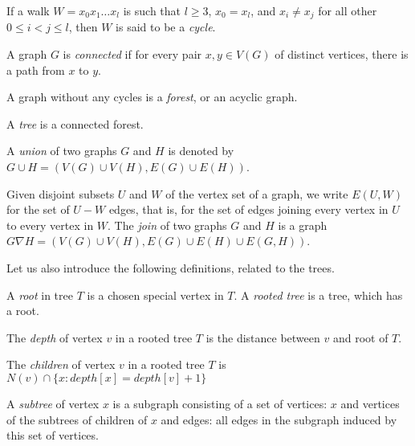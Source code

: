 \begin{definition}[cycle]
  If a walk $W = x_0 x_1 \ldots x_l$ is such that $l \geq 3$, $x_0 = x_l$, and $x_i \ne x_j$ for all other $0 \leq i < j \leq l$, then $W$ is said to be a \emph{cycle}.
\end{definition}

\begin{definition}
     A graph $G$ is \emph{connected} if for every pair $x, y \in V(G)$ of distinct vertices, there is a path from $x$ to $y$.
\end{definition}

\begin{definition}
    A graph without any cycles is a \emph{forest}, or an acyclic graph.
    
    A \emph{tree} is a connected forest.
\end{definition}

\begin{definition}[union]
    A \emph{union} of two graphs $G$ and $H$ is denoted by $G \cup H = (V(G) \cup V(H), E(G) \cup E(H))$.
\end{definition}

\begin{definition}[join]
Given disjoint subsets $U$ and $W$ of the vertex set of a graph, we write $E(U,W)$ for the set of $U - W$ edges, that is, for the set of edges joining every vertex in $U$ to every vertex in $W$. The \emph{join} of two graphs $G$ and $H$ is a graph $G \nabla H = (V(G) \cup V(H), E(G) \cup E(H) \cup E(G, H) )$.
\end{definition}

Let us also introduce the following definitions, related to the trees.

\begin{definition}
    A \emph{root} in tree $T$ is a chosen special vertex in $T$.
    A \emph{rooted tree} is a tree, which has a root.
\end{definition}

The \emph{depth} of vertex $v$ in a rooted tree $T$ is the distance between $v$ and root of $T$. 

\begin{definition}[children]
    The \emph{children} of vertex $v$ in a rooted tree $T$ is $N(v) \cap \{x : depth[x] = depth[v] + 1\}$
\end{definition}

\begin{definition}[subtree]
    A \emph{subtree} of vertex $x$ is a subgraph consisting of a set of vertices: $x$ and vertices of the subtrees of children of $x$ and edges: all edges in the subgraph induced by this set of vertices.
\end{definition}



